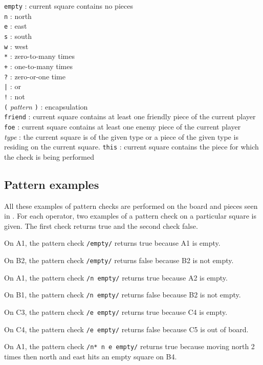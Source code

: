 \texttt{empty} : current square contains no pieces\\
\texttt{n} : north \\
\texttt{e} : east \\
\texttt{s} : south \\
\texttt{w} : west \\
\texttt{*} : zero-to-many times\\
\texttt{+} : one-to-many times\\
\texttt{?} : zero-or-one time\\
\texttt{|} : or\\
\texttt{!} : not\\
\texttt{(} \textit{pattern} \texttt{)} : encapsulation\\
\texttt{friend} :  current square contains at least one friendly piece of the current player\\
\texttt{foe} : current square contains at least one enemy piece of the current player\\
\textit{type} : the current square is of the given type or a piece of the given type is residing on the current square.
\texttt{this} : current square contains the piece for which the check is being performed\\

\subsection{Pattern examples}
\label{sec:patternexamples}
All these examples of pattern checks are performed on the board and pieces seen in . For each operator, two examples of a pattern check on a particular square is given. The first check returns true and the second check false.

\begin{nlist}
\item On A1, the pattern check \texttt{/empty/} returns true because A1 is empty.
\item On B2, the pattern check \texttt{/empty/} returns false because B2 is not empty.
\item On A1, the pattern check \texttt{/n empty/} returns true because A2 is empty.
\item On B1, the pattern check \texttt{/n empty/} returns false because B2 is not empty.
\item On C3, the pattern check \texttt{/e empty/} returns true because C4 is empty.
\item On C4, the pattern check \texttt{/e empty/} returns false because C5 is out of board.
\item On A1, the pattern check \texttt{/n* n e empty/} returns true because moving north 2 times then north and east hits an empty square on B4.
\end{nlist}

